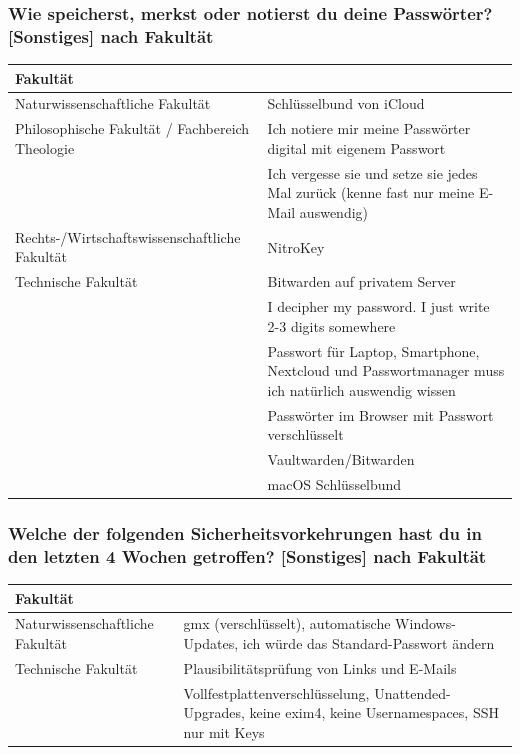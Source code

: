 \documentclass[german,report]{i1thesis}
\begin{document}
\subsubsection*{Wie speicherst, merkst oder notierst du deine Passwörter? [Sonstiges] nach Fakultät}
\begin{longtable}{|p{5cm}|p{9cm}|}
\hline
Fakultät & \\
\hline
Naturwissenschaftliche Fakultät & Schlüsselbund von iCloud \\
\hline
Philosophische Fakultät / Fachbereich Theologie & Ich notiere mir meine Passwörter digital mit eigenem Passwort \\ \cline{2-2}
 & Ich vergesse sie und setze sie jedes Mal zurück (kenne fast nur meine E-Mail auswendig) \\
\hline
Rechts-/Wirtschaftswissenschaftliche Fakultät & NitroKey \\
\hline
Technische Fakultät & Bitwarden auf privatem Server \\ \cline{2-2}
 & I decipher my password. I just write 2-3 digits somewhere \\ \cline{2-2}
 & Passwort für Laptop, Smartphone, Nextcloud und Passwortmanager muss ich natürlich auswendig wissen \\ \cline{2-2}
 & Passwörter im Browser mit Passwort verschlüsselt \\ \cline{2-2}
 & Vaultwarden/Bitwarden \\ \cline{2-2}
 & macOS Schlüsselbund \\
\hline
\end{longtable}

\subsubsection*{Welche der folgenden Sicherheitsvorkehrungen hast du in den letzten 4 Wochen getroffen? [Sonstiges] nach Fakultät}
\begin{longtable}{|p{5cm}|p{9cm}|}
\hline
Fakultät & \\
\hline
Naturwissenschaftliche Fakultät & gmx (verschlüsselt), automatische Windows-Updates, ich würde das Standard-Passwort ändern \\
\hline
Technische Fakultät & Plausibilitätsprüfung von Links und E-Mails \\ \cline{2-2}
 & Vollfestplattenverschlüsselung, Unattended-Upgrades, keine exim4, keine Usernamespaces, SSH nur mit Keys \\
\hline
\end{longtable}
\end{document}
